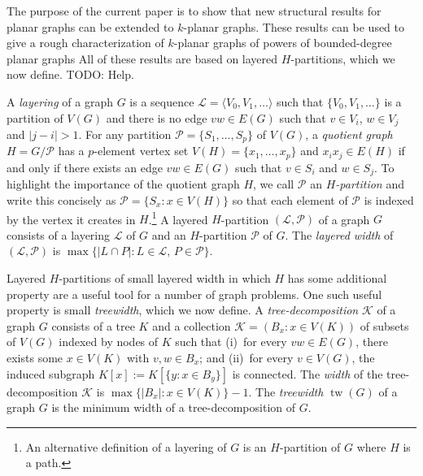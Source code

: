 \documentclass{patmorin}
\DeclareMathOperator{\tw}{tw}
\begin{document}

The purpose of the current paper is to show that new structural results for planar graphs can be extended to $k$-planar graphs.  These results can be used to give a rough characterization of $k$-planar graphs of powers of bounded-degree planar graphs
All of these results are based on layered $H$-partitions, which we now define.
{\color{red}TODO: Help.}

A \emph{layering} of a graph $G$ is a sequence $\mathcal{L}=\langle V_0,V_1,\ldots\rangle$ such that $\{V_0,V_1,\ldots\}$ is a partition of $V(G)$ and there is no edge $vw\in E(G)$ such that $v\in V_i$, $w\in V_j$ and $|j-i|>1$.  For any partition $\mathcal{P}=\{S_1,\ldots,S_p\}$ of $V(G)$, a \emph{quotient graph} $H=G/\mathcal{P}$ has a $p$-element vertex set $V(H)=\{x_1,\ldots,x_p\}$ and $x_ix_j\in E(H)$ if and only if there exists an edge $vw\in E(G)$ such that $v\in S_i$ and $w\in S_j$. To highlight the importance of the quotient graph $H$, we call $\mathcal{P}$ an \emph{$H$-partition} and write this concisely as $\mathcal{P}=\{S_x : x\in V(H)\}$ so that each element of $\mathcal{P}$ is indexed by the vertex it creates in $H$.\footnote{An alternative definition of a layering of $G$ is an $H$-partition of $G$ where $H$ is a path.}  A layered $H$-partition $(\mathcal{L},\mathcal{P})$ of a graph $G$ consists of a layering $\mathcal{L}$ of $G$ and an $H$-partition $\mathcal{P}$ of $G$. The \emph{layered width} of $(\mathcal{L},\mathcal{P})$ is $\max\{|L\cap P|: L\in\mathcal{L},\, P\in\mathcal{P}\}$.

Layered $H$-partitions of small layered width in which $H$ has some additional property are a useful tool for a number of graph problems.  One such useful property is small \emph{treewidth}, which we now define. A \emph{tree-decomposition} $\mathcal{K}$ of a graph $G$ consists of a tree $K$ and a collection $\mathcal{K}=(B_x:x\in V(K))$ of subsets of $V(G)$ indexed by nodes of $K$ such that (i)~for every $vw\in E(G)$, there exists some $x\in V(K)$ with $v,w\in B_x$; and (ii)~for every $v\in V(G)$, the induced subgraph $K[x] := K[\{y: x\in B_y\}]$ is connected.  The \emph{width} of the tree-decomposition $\mathcal{K}$ is $\max\{|B_x|:x\in V(K)\}-1$.  The \emph{treewidth} $\tw(G)$ of a graph $G$ is the minimum width of a tree-decomposition of $G$.  
\end{document}
